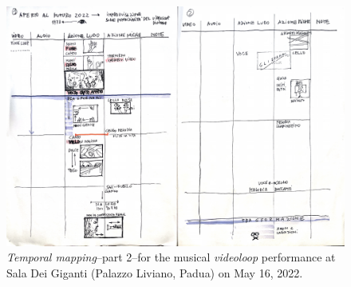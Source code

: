 \begin{figure}
    \centering
    \includegraphics[height=\linewidth, angle=90]{chapters/appendix/a/image/figa-data-temporal01b.pdf}
    \caption{\textit{Temporal mapping}–part 2–for the musical \textit{videoloop} performance at Sala Dei Giganti (Palazzo Liviano, Padua) on May 16, 2022.}
    \label{fig:aa-mapping-temporal-01b}
\end{figure}

